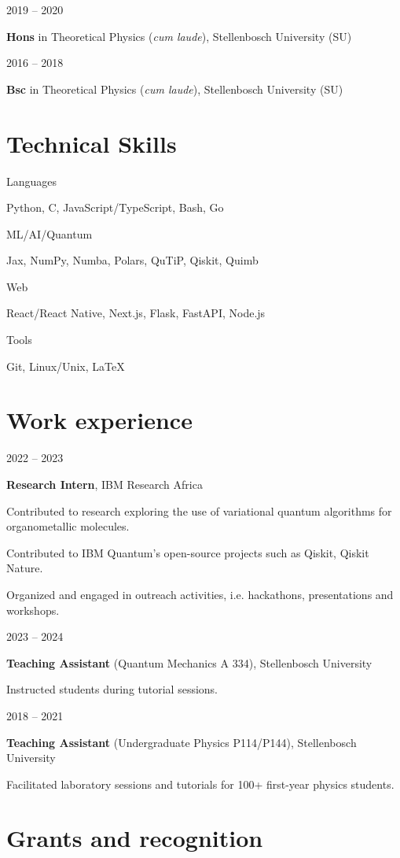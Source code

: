 \documentclass[9pt]{extreport}
\newcommand{\listitemspace}{0.25em}
\renewenvironment{itemize}
{\begin{list}{}{
    \setlength{\leftmargin}{0em}
    \setlength{\parskip}{0em}
    \setlength{\itemsep}{\listitemspace}
    \setlength{\parsep}{\listitemspace}}}
{\end{list}}
\newcommand{\entry}[2]{%
  \noindent%
  \begin{minipage}[t]{2.25cm}%
    \raggedright #1%
  \end{minipage}%
  \hspace{0.4cm}%
  \begin{minipage}[t]{\dimexpr\textwidth-2cm\relax}%
    #2%
  \end{minipage}%
  \vspace{0.25cm}%
}
\begin{document}
\entry{2019 -- 2020}{\textbf{Hons} in Theoretical Physics (\textit{cum laude}), Stellenbosch University (SU)}

\entry{2016 -- 2018}{\textbf{Bsc} in Theoretical Physics (\textit{cum laude}), Stellenbosch University (SU)}

\section*{Technical Skills}

\entry{Languages}{Python, C, JavaScript/TypeScript, Bash, Go}

\entry{ML/AI/Quantum}{Jax, NumPy, Numba, Polars, QuTiP, Qiskit, Quimb}

\entry{Web}{React/React Native, Next.js, Flask, FastAPI, Node.js}

\entry{Tools}{Git, Linux/Unix, LaTeX}

\section*{Work experience}

\entry{2022 -- 2023}{\textbf{Research Intern}, IBM Research Africa
\begin{itemize}
    \item Contributed to research exploring the use of variational quantum algorithms for organometallic molecules.
    \item Contributed to IBM Quantum's open-source projects such as Qiskit, Qiskit Nature.
    \item Organized and engaged in outreach activities, i.e. hackathons, presentations and workshops.
\end{itemize}}

\entry{2023 -- 2024}{\textbf{Teaching Assistant} (Quantum Mechanics A 334), Stellenbosch University
\begin{itemize}
  \item Instructed students during tutorial sessions.
\end{itemize}}

\entry{2018 -- 2021}{\textbf{Teaching Assistant} (Undergraduate Physics P114/P144), Stellenbosch University
\begin{itemize}
  \item Facilitated laboratory sessions and tutorials for 100+ first-year physics students.
\end{itemize}}

\section*{Grants and recognition}
\end{document}
